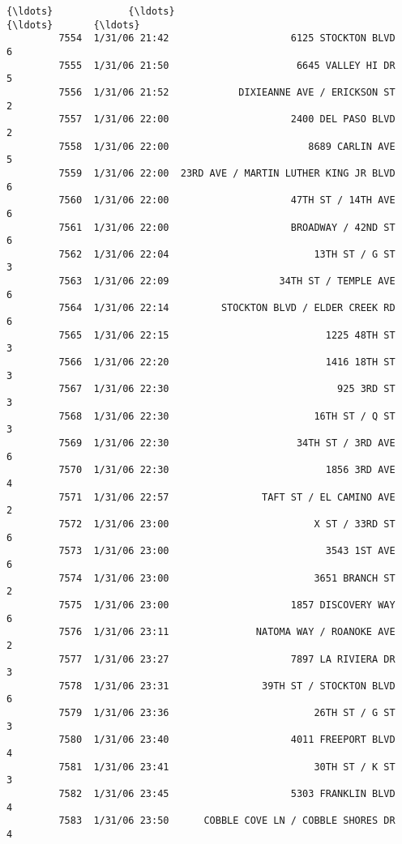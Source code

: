 \documentclass[11pt]{article}
\begin{document}
\begin{Verbatim}[commandchars=\\\{\}]
         {\ldots}             {\ldots}                                    {\ldots}       {\ldots}   
         7554  1/31/06 21:42                     6125 STOCKTON BLVD         6   
         7555  1/31/06 21:50                      6645 VALLEY HI DR         5   
         7556  1/31/06 21:52            DIXIEANNE AVE / ERICKSON ST         2   
         7557  1/31/06 22:00                     2400 DEL PASO BLVD         2   
         7558  1/31/06 22:00                        8689 CARLIN AVE         5   
         7559  1/31/06 22:00  23RD AVE / MARTIN LUTHER KING JR BLVD         6   
         7560  1/31/06 22:00                     47TH ST / 14TH AVE         6   
         7561  1/31/06 22:00                     BROADWAY / 42ND ST         6   
         7562  1/31/06 22:04                         13TH ST / G ST         3   
         7563  1/31/06 22:09                   34TH ST / TEMPLE AVE         6   
         7564  1/31/06 22:14         STOCKTON BLVD / ELDER CREEK RD         6   
         7565  1/31/06 22:15                           1225 48TH ST         3   
         7566  1/31/06 22:20                           1416 18TH ST         3   
         7567  1/31/06 22:30                             925 3RD ST         3   
         7568  1/31/06 22:30                         16TH ST / Q ST         3   
         7569  1/31/06 22:30                      34TH ST / 3RD AVE         6   
         7570  1/31/06 22:30                           1856 3RD AVE         4   
         7571  1/31/06 22:57                TAFT ST / EL CAMINO AVE         2   
         7572  1/31/06 23:00                         X ST / 33RD ST         6   
         7573  1/31/06 23:00                           3543 1ST AVE         6   
         7574  1/31/06 23:00                         3651 BRANCH ST         2   
         7575  1/31/06 23:00                     1857 DISCOVERY WAY         6   
         7576  1/31/06 23:11               NATOMA WAY / ROANOKE AVE         2   
         7577  1/31/06 23:27                     7897 LA RIVIERA DR         3   
         7578  1/31/06 23:31                39TH ST / STOCKTON BLVD         6   
         7579  1/31/06 23:36                         26TH ST / G ST         3   
         7580  1/31/06 23:40                     4011 FREEPORT BLVD         4   
         7581  1/31/06 23:41                         30TH ST / K ST         3   
         7582  1/31/06 23:45                     5303 FRANKLIN BLVD         4   
         7583  1/31/06 23:50      COBBLE COVE LN / COBBLE SHORES DR         4   
         

\end{Verbatim}
\end{document}
